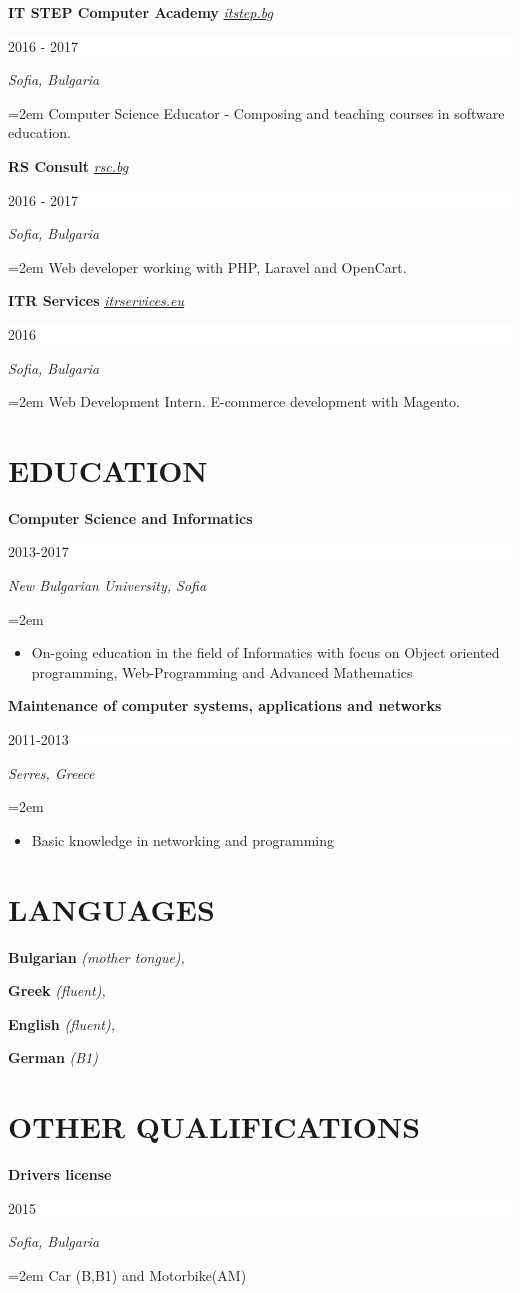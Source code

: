 \documentclass[paper=letter,fontsize=11pt]{scrartcl} %
\newcommand{\sepspace}{\vspace*{1em}}		%
\newcommand{\NewPart}[2]{\section*{\uppercase{#1} \small \normalfont #2}}
\newcommand{\EducationEntry}[4]{
		\noindent \textbf{#1} \hfill      %
		\colorbox{White}{%
			\parbox{6em}{%
			\hfill\color{Black}#2}} \par  %
		\noindent \textit{#3} \par        %
		\noindent\hangindent=2em\hangafter=0 \small #4 %
		\normalsize \par}
\newcommand{\WorkEntry}[5]{
		\noindent \textbf{#1}
        \noindent \small \textit{#2}
        \hfill      %
        \colorbox{White}{%
			\parbox{6em}{%
			\hfill\color{Black}#3}} \par  %
		\noindent \textit{#4} \par        %
		\noindent\hangindent=2em\hangafter=0 \small #5 %
		\normalsize \par}
\newcommand{\Language}[2]{
		\noindent \textbf{#1}
        \noindent \small \textit{#2}}
\begin{document}
\WorkEntry{IT STEP Computer Academy}{\href{https://itstep.bg/}{itstep.bg}}{2016 - 2017}{Sofia, Bulgaria}{Computer Science Educator - Composing and teaching courses in software education.}

\sepspace

\WorkEntry{RS Consult}{\href{http://rsc.bg/}{rsc.bg}}{2016 - 2017}{Sofia, Bulgaria}{Web developer working with PHP, Laravel and OpenCart.}

\sepspace

\WorkEntry{ITR Services}{\href{http://itrservices.eu/}{itrservices.eu}}{2016}{Sofia, Bulgaria}{Web Development Intern. E-commerce development with Magento.}

\sepspace

\NewPart{Education}{}


\EducationEntry{Computer Science and Informatics}
{2013-2017}
{New Bulgarian University, Sofia}
{\begin{itemize}
\item{On-going education in the field of Informatics with focus on Object oriented programming, Web-Programming and Advanced Mathematics}
\end{itemize}}

\sepspace
\newpage
\EducationEntry{Maintenance of computer systems, applications and networks
}{2011-2013}{Serres, Greece}{
\begin{itemize}\item{Basic knowledge in networking and programming}\end{itemize}}



\NewPart{LANGUAGES}{}

\Language{Bulgarian}{(mother tongue),}
\Language{Greek}{ (fluent),}
\Language{English}{(fluent),}
\Language{German}{(B1)}

\NewPart{OTHER QUALIFICATIONS}{}

\WorkEntry{Drivers license}{}{2015}{Sofia, Bulgaria}{Car (B,B1) and Motorbike(AM)}
\end{document}
